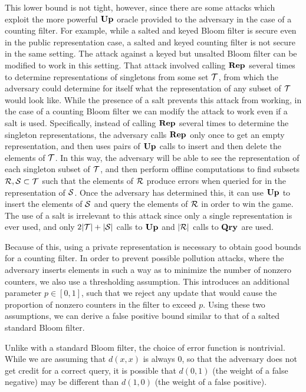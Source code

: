 This lower bound is not tight, however, since there are some attacks which
exploit the more powerful $\mathbf{Up}\hspace{0.5pt}$ oracle provided to the adversary in the case of
a counting filter. For example, while a salted and keyed Bloom filter is secure even in the public representation case, a salted and keyed counting filter is not secure in the same setting. The attack against a keyed but unsalted Bloom filter can be modified to work in this setting. That attack involved calling $\mathbf{Rep}\hspace{0.5pt}$ several times to determine representations of singletons from some set $\mathcal{T}$, from which the adversary could determine for itself what the representation of any subset of $\mathcal{T}$ would look like. While the presence of a salt prevents this attack from working, in the case of a counting Bloom filter we can modify the attack to work even if a salt is used. Specifically, instead of calling $\mathbf{Rep}\hspace{0.5pt}$ several times to determine the singleton representations, the adversary calls $\mathbf{Rep}\hspace{0.5pt}$ only once to get an empty representation, and then uses pairs of $\mathbf{Up}\hspace{0.5pt}$ calls to insert and then delete the elements of $\mathcal{T}$. In this way, the adversary will be able to see the representation of each singleton subset of $\mathcal{T}$, and then perform offline computations to find subsets $\mathcal{R}, \mathcal{S} \subset \mathcal{T}$ such that the elements of $\mathcal{R}$ produce errors when queried for in the representation of $\mathcal{S}$. Once the adversary has determined this, it can use $\mathbf{Up}\hspace{0.5pt}$ to insert the elements of $\mathcal{S}$ and query the elements of $\mathcal{R}$ in order to win the game. The use of a salt is irrelevant to this attack since only a single representation is ever used, and only $2|\mathcal{T}|+|\mathcal{S}|$ calls to $\mathbf{Up}\hspace{0.5pt}$ and $|\mathcal{R}|$ calls to $\mathbf{Qry}\hspace{0.5pt}$ are used.

Because of this, using a private representation is necessary to obtain good bounds for a counting filter. In order to prevent possible pollution attacks, where the adversary inserts elements in such a way as to minimize the number of nonzero counters, we also use a thresholding assumption. This introduces an additional parameter $p \in [0,1]$, such that we reject any update that would cause the proportion of nonzero counters in the filter to exceed $p$. Using these two assumptions, we can derive a
false positive bound similar to that of a salted standard Bloom filter.

Unlike with a standard Bloom filter, the choice of error function is nontrivial. While we are assuming that $d(x,x)$ is always 0, so that the adversary does not get credit for a correct query, it is possible that $d(0,1)$ (the weight of a false negative) may be different than $d(1,0)$ (the weight of a false positive).

